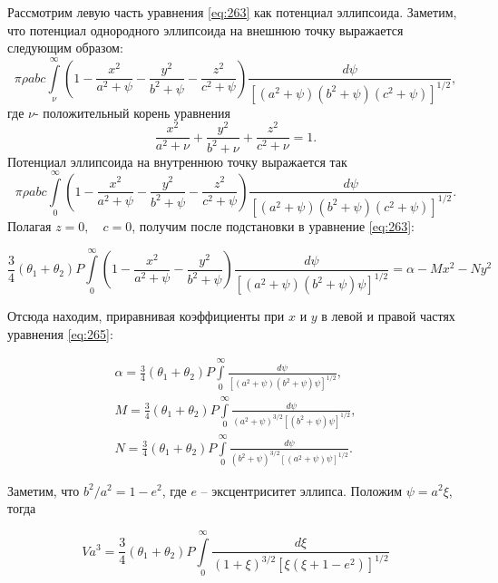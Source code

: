 \documentclass[specialist, subf, href, colorlinks=true, 14pt, final]{disser}
\theoremstyle{definition}
\begin{document}
Рассмотрим левую часть уравнения \eqref{eq:263} как потенциал эллипсоида. Заметим, что потенциал однородного эллипсоида на внешнюю точку выражается следующим образом:
\[ \pi \rho a b c \int \limits_{\nu}^{\infty} \left( 1 - \frac{x^2}{a^2 + \psi} - \frac{y^2}{b^2 + \psi} - \frac{z^2}{c^2 + \psi}  \right) \frac{d \psi}{\left[(a^2 + \psi)(b^2 + \psi)(c^2 + \psi)\right]^{1/2}} , \]
где $\nu $- положительный корень уравнения
\[ \frac{x^2}{a^2 + \nu} + \frac{y^2}{b^2 + \nu} + \frac{z^2}{c^2 + \nu} = 1.\]
Потенциал эллипсоида на внутреннюю точку выражается так
\[ \pi \rho a b c \int \limits_{0}^{\infty} \left( 1 - \frac{x^2}{a^2 + \psi} - \frac{y^2}{b^2 + \psi} - \frac{z^2}{c^2 + \psi}  \right) \frac{d \psi}{\left[(a^2 + \psi)(b^2 + \psi)(c^2 + \psi)\right]^{1/2}}. \]
Полагая $z = 0, \quad c = 0$, получим после подстановки в уравнение \eqref{eq:263}:
\addtocounter{equation}{1}
\begin{equation}\label{eq:265}
   \frac{3}{4}(\theta_1 + \theta_2)P \int \limits_0^{\infty} \left( 1 - \frac{x^2}{a^2 + \psi} - \frac{y^2}{b^2 + \psi} \right) \frac{d \psi}{\left[(a^2 + \psi)(b^2 + \psi)\psi\right]^{1/2}} = \alpha - Mx^2 - N y^2 
    \tag{5}
\end{equation}
  
Отсюда находим, приравнивая коэффициенты при $x$ и $y$ в левой и правой частях уравнения \eqref{eq:265}:
  \addtocounter{equation}{1}
  \begin{equation}\label{eq:266}
    \begin{array}{l}
      \alpha = \frac{3}{4}(\theta_1 + \theta_2)P \int \limits_0^{\infty}\displaystyle \frac{d \psi}{\left[(a^2 + \psi)(b^2 + \psi)\psi\right]^{1/2}},\\
      M = \frac{3}{4}(\theta_1 + \theta_2)P \int \limits_0^{\infty}\displaystyle \frac{d \psi}{(a^2 + \psi)^{3/2}\left[(b^2 + \psi)\psi\right]^{1/2}},\\
      N = \frac{3}{4}(\theta_1 + \theta_2)P \int \limits_0^{\infty}\displaystyle \frac{d \psi}{(b^2 + \psi)^{3/2}\left[(a^2 + \psi)\psi\right]^{1/2}}.
    \end{array}
    \tag{6}
  \end{equation}
  
Заметим, что $b^2/a^2 = 1 - e^2$, где $e$ -- эксцентриситет эллипса. Положим $\psi = a^2 \xi$, тогда
\addtocounter{equation}{1}
\begin{equation}\label{eq:267}
   V a^3 = \frac{3}{4}(\theta_1 + \theta_2)P \int \limits_0^{\infty}\displaystyle \frac{d \xi}{(1 + \xi)^{3/2}\left[\xi(\xi + 1 - e^2)\right]^{1/2}}
    \tag{7}
\end{equation}
  
\end{document}

